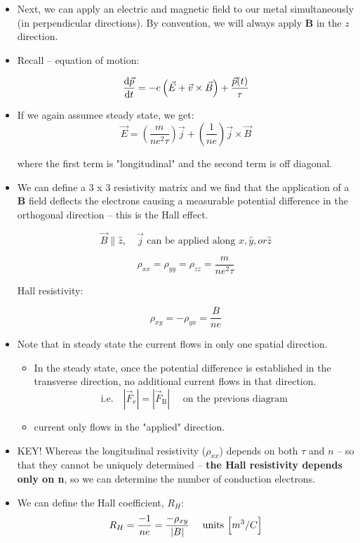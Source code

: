 \begin{itemize}

    \item Next, we can apply an electric and magnetic field to our metal simultaneously (in perpendicular directions). By convention, we will always apply $\mathbf{B}$ in the $z$ direction. 
    
    \item Recall -- equation of motion:
    
    \[ \dv{\vec{p}}{t} = -e \left( \vec{E} + \vec{v} \times \vec{B} \right) + \frac{\vec{p}(t)}{\tau} \]

    \item If we again assumee steady state, we get:
    \[ \vec{E} = \left( \frac{m}{ne^2 \tau} \right) \vec{j} + \left( \frac{1}{ne} \right) \vec{j} \times \vec{B} \]

    where the first term is "longitudinal"  and the second term is off diagonal.

    \item We can define a 3 x 3 resistivity matrix and we find that the application of a $\mathbf{B}$ field deflects the electrons causing a measurable potential difference in the orthogonal direction -- this is the Hall effect.
    
    \[ \vec{B} \parallel \hat{z}, \quad \vec{j} \text{ can be applied along } \hat{x}, \hat{y}, or \hat{z} \]
        
    \[ \rho_{xx} = \rho_{yy} = \rho_{zz} = \frac{m}{ne^2 \tau} \]

    Hall resistivity:

    \[ \boxed{ \rho_{xy} = -\rho_{yx} = \frac{B}{ne}} \]

    \item Note that in steady state the current flows in only one spatial direction.
    
    \begin{itemize}
        \item In the steady state, once the potential difference is established in the transverse direction, no additional current flows in that direction.
        \[ \text{i.e.} \quad |\vec{F}_{\text{e}}| = |\vec{F}_{\text{B}}| \quad \text{ on the previous diagram} \]

        
        \item current only flows in the "applied" direction.
    \end{itemize}

    \item KEY! Whereas the longitudinal resistivity ($\rho_{xx}$) depends on both $\tau$ and $n$ -- so that they cannot be uniquely determined -- \textbf{the Hall resistivity depends only on n}, so we can determine the number of conduction electrons. 
    \item We can define the Hall coefficient, $R_H$:
    \[ R_H = \frac{-1}{ne} = \frac{-\rho_{xy}}{|B|} \quad \text{ units } \brackets*{m^3/C}\]


\end{itemize}
